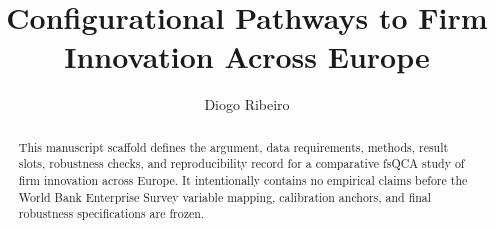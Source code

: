 \documentclass[11pt]{article}
\title{Configurational Pathways to Firm Innovation Across Europe}
\author{Diogo Ribeiro}
\date{}
\begin{document}
\maketitle

\begin{abstract}
This manuscript scaffold defines the argument, data requirements, methods,
result slots, robustness checks, and reproducibility record for a comparative
fsQCA study of firm innovation across Europe. It intentionally contains no
empirical claims before the World Bank Enterprise Survey variable mapping,
calibration anchors, and final robustness specifications are frozen.
\end{abstract}













\end{document}
